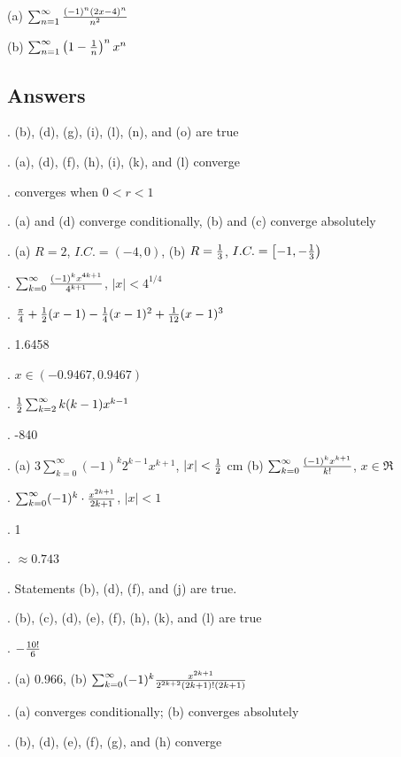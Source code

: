 \documentclass[12pt]{article}
\begin{document}
\noindent (a) $\sum_{n=1}^\infty {{(-1)^n(2x-4)^n}\over{n^2}}$

\medskip
\noindent (b) $\sum_{n=1}^\infty \left (1-{{1}\over{n}} \right )^{n}x^n$

\subsection*{Answers}

. (b), (d), (g), (i), (l), (n), and (o) are true

. (a), (d), (f), (h), (i), (k), and (l) converge

. converges 
when $0 < r < 1$

. (a) and (d) converge conditionally, (b) and (c) converge 
absolutely

.  (a) $R=2$, $I.C. = (-4,0)$, (b) $R={{1}\over{3}}$, $
I.C. = \left [ -1, -{{1}\over{3}} \right )$

.  $\sum_{k=0}^{\infty} {{(-1)^kx^{4k+1}}\over{4^{k+1}}}$, $|x| < 4^{1/4}$

. ${{\pi}\over{4}} + {{1}\over{2}} (x-1) - {{1}\over{4}} 
(x-1)^2 + {{1}\over{12}} (x-1)^3$

. 1.6458 

. $x \in (-0.9467, 0.9467)$

.  ${{1}\over{2}}\sum_{k=2}^{\infty} k(k-1)x^{k-1}$

.  -840

. (a) $3 \sum_{k=0}^{\infty} (-1)^k 2^{k-1} x^{k+1}$, $|x| <
{{1}\over{2}}$  cm (b) $\sum_{k=0}^{\infty} {{(-1)^k 
x^{k+1}}\over{k!}}$, $x \in \Re$


. $\sum_{k=0}^{\infty} (-1)^k \cdot {{x^{2k+1}}\over{2k+1}}$,
$|x| < 1$ 

. 1 

. $\approx 0.743$

.  Statements (b), (d), (f), and (j) are true.

.  (b), (c), (d), (e), (f), (h), (k), and (l) are true

.  $-{{10!}\over{6}}$

.  (a) 0.966, (b) $\sum_{k=0}^{\infty} (-1)^k {{x^{2k+1}}\over
{2^{2k+2}(2k+1)!(2k+1)}}$

.  (a) converges conditionally; (b) converges absolutely

. (b), (d), (e), (f), (g), and (h) converge
\end{document}
